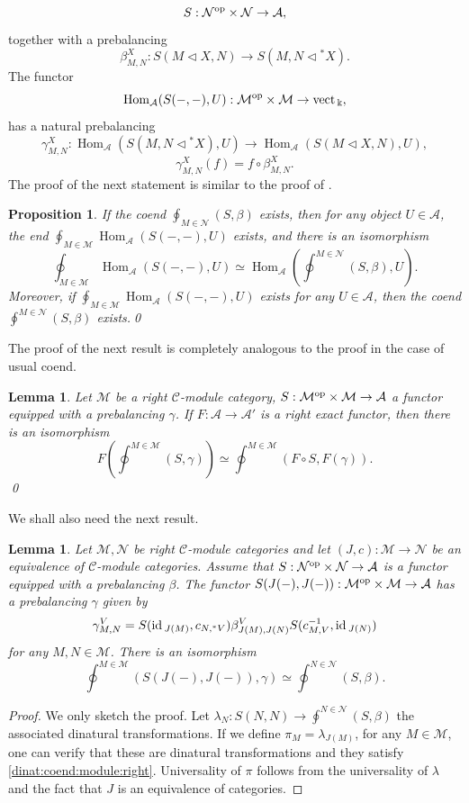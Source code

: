 \documentclass[11pt]{amsart}
\newcommand{\Mo}{{\mathcal M}}
\newcommand{\No}{{\mathcal N}}
\newcommand{\ca}{{\mathcal C}}
\newcommand{\op}{\rm{op}}
\newcommand{\Ac}{{\mathcal A}}
\newcommand{\ac}{{\mathcal A}}
\newcommand{\ku}{{\Bbbk}}
\newcommand{\id}{\mbox{\rm id\,}}
\newcommand{\vect}{\mbox{\rm vect\,}}
\newcommand\Hom{\operatorname{Hom}}
\renewcommand{\_}[1]{\mbox{$_{\left( #1 \right)}$}}
\theoremstyle{plain}
\numberwithin{equation}{section}
\newtheorem{lema}[teo]{Lemma}
\newtheorem{prop}[teo]{Proposition}
\theoremstyle{definition}
\theoremstyle{remark}
\def\pf{\begin{proof}}
\def\epf{\end{proof}}
\theoremstyle{introTheorems}
\begin{document}
$$S:\No^{\op}\times \No\to \Ac,$$
together with a prebalancing
$$\beta^X_{M,N}: S(M \triangleleft X, N)\to S(M,N \triangleleft {}^*X).$$
The functor
$$\Hom_\Ac(S(-,-), U):\Mo^{\op}\times \Mo\to \vect_\ku, $$
has a natural prebalancing 
$$ \gamma^X_{M,N}:\Hom_\Ac(S(M, N\triangleleft {}^* X), U)\to \Hom_\Ac( S(M\triangleleft X, N),U),$$
$$\gamma^X_{M,N}(f)=f\circ \beta^X_{M,N}.$$
The proof of the next statement is similar to the proof of \cite[Prop. 3.3 (ii)]{BM}.
\begin{prop}\label{int-hom} If the coend  $\oint_{M\in \No} (S,\beta)$ exists, then for any object $U\in \Ac$,  the end $\oint_{M\in \Mo} \Hom_\Ac( S( -, -), U)$ exists, and there is an isomorphism
$$\oint_{M\in \Mo} \Hom_\Ac(S( -, -),U)\simeq  \Hom_\Ac( \oint^{M\in \No} (S,\beta), U).$$
Moreover, if $\oint_{M\in \Mo} \Hom_\Ac(S( -, -),U)$ exists for any $U\in \Ac$, then the coend $\oint^{M\in \No} (S,\beta)$ exists.\qed
\end{prop}

The proof of the next result is completely analogous to the proof in the case of usual coend.

\begin{lema}\label{right-exact-on-coend} Let $\Mo$ be a right $\ca$-module category, $S:\Mo^{\op}\times \Mo\to \ac$ a functor equipped with a prebalancing $\gamma$. If $F:\Ac\to \Ac'$ is a right exact functor, then there is an isomorphism
$$F(\oint^{M\in \Mo} (S,\gamma))\simeq \oint^{M\in \Mo} (F\circ S,F(\gamma)).$$\qed
\end{lema}

We shall also need the next result.
\begin{lema}\label{equivalence-on-coend} Let $\Mo, \No$ be right $\ca$-module categories and let $(J,c):\Mo\to\No$ be an equivalence of $\ca$-module categories. Assume that $S:\No^{\op}\times \No\to \ac$ is a functor equipped with a prebalancing $\beta$. The functor $S(J(-), J(-)):\Mo^{\op}\times \Mo\to \ac$ has a prebalancing $\gamma$ given by
$$\gamma^V_{M,N}=S(\id_{J(M)},c_{N,{}^*V})\beta^V_{J(M),J(N)}S(c^{-1}_{M,V},\id_{J(N)}) $$
for any $M,N\in \Mo$. There is an isomorphism
$$\oint^{M\in \Mo}  (S(J(-), J(-)),\gamma)\simeq \oint^{N\in \No}  (S,\beta).$$
\end{lema}
\pf We only sketch the proof. Let $\lambda_N:S(N,N)\to \oint^{N\in \No}  (S,\beta)$ the associated dinatural transformations. If we define $\pi_M=\lambda_{J(M)}$, for any $M\in \Mo$, one can verify that these are dinatural transformations and they satisfy \eqref{dinat:coend:module:right}. Universality of $\pi$ follows from the universality of $\lambda$ and the fact that $J$ is an equivalence of categories.
\epf
\end{document}
